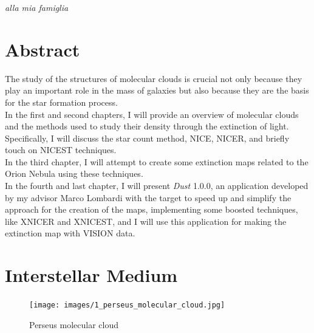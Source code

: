 \documentclass[a4paper,11pt,twoside]{book}
\begin{document}



\cleardoublepage\thispagestyle{empty} 
\vspace*{1cm} 
\textit{
\flushright
alla mia famiglia
\vfill
}



\chapter*{\centering Abstract}






The study of the structures of molecular clouds is crucial not only because they play an important role in the mass of galaxies but also because they are the basis for the star formation process. \\

In the first and second chapters, I will provide an overview of molecular clouds and the methods used to study their density through the extinction of light. Specifically, I will discuss the star count method, NICE, NICER, and briefly touch on NICEST techniques.\\

In the third chapter, I will attempt to create some extinction maps related to the Orion Nebula using these techniques. \\

In the fourth and last chapter, I will present \textit{Dust} 1.0.0, an application developed by my advisor Marco Lombardi with the target to speed up and simplify the approach for the creation of the maps, implementing some boosted techniques, like XNICER and XNICEST, and I will use this application for making the extinction map with VISION data.



\newpage\null\thispagestyle{empty}\newpage
\tableofcontents
\newpage\null\thispagestyle{empty}\newpage

\mainmatter

\chapter{Interstellar Medium}

\begin{figure}[H]
	\centering
	\texttt{[image: images/1\_perseus\_molecular\_cloud.jpg]}
	\caption{Perseus molecular cloud}
	\label{fig:image}
\end{figure}
\end{document}
